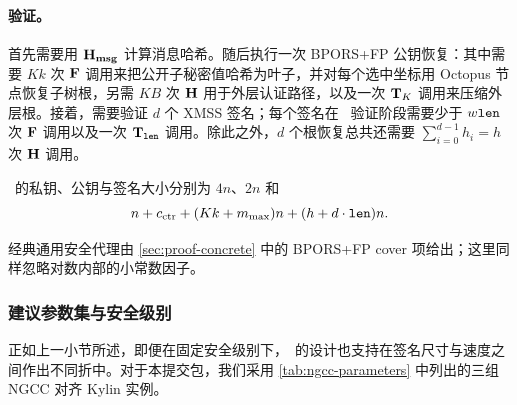 \paragraph{验证。}
首先需要用 $\mathbf{H_{msg}}$ 计算消息哈希。随后执行一次 BPORS+FP 公钥恢复：其中需要 $Kk$ 次 $\mathbf{F}$ 调用来把公开子秘密值哈希为叶子，并对每个选中坐标用 Octopus 节点恢复子树根，另需 $KB$ 次 $\mathbf{H}$ 用于外层认证路径，以及一次 $\mathbf{T}_K$ 调用来压缩外层根。接着，需要验证 $d$ 个 XMSS 签名；每个签名在 \WOTSCS\ 验证阶段需要少于 $w \mathtt{len}$ 次 $\mathbf{F}$ 调用以及一次 $\mathbf{T}_{\mathtt{len}}$ 调用\footnotemark。除此之外，$d$ 个根恢复总共还需要 $\sum_{i=0}^{d-1} h_i = h$ 次 $\mathbf{H}$ 调用。


\SPHINCSA\ 的私钥、公钥与签名大小分别为 $4n$、$2n$ 和
\[
    n+c_{\mathrm{ctr}}+(Kk+m_{\max})n+(h+d\cdot\mathtt{len})n .
\]

经典通用安全代理由 \cref{sec:proof-concrete} 中的 BPORS+FP cover 项给出；这里同样忽略对数内部的小常数因子。

\subsubsection{建议参数集与安全级别}

正如上一小节所述，即便在固定安全级别下，\SPHINCSA\ 的设计也支持在签名尺寸与速度之间作出不同折中。对于本提交包，我们采用 \cref{tab:ngcc-parameters} 中列出的三组 NGCC 对齐 Kylin 实例。

\begin{table}[H]
    \centering
    \caption{Kylin 参数族。}
    \label{tab:ngcc-parameters}
    \scriptsize
\end{table}

